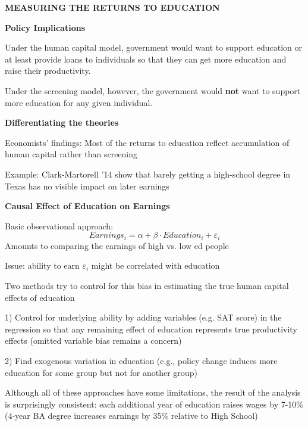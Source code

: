 \documentclass[landscape]{slides}
\begin{document}
\begin{slide}
\begin{center}
{\bf MEASURING THE RETURNS TO EDUCATION}
\end{center}

{\bf Policy Implications}

Under the human capital model, government would want to support education or at least provide loans to individuals so that they can get more education and raise their productivity.

Under the screening model, however, the government would \textbf{not} want to support more education for any given individual.

{\bf Differentiating the theories}

Economists' findings: Most of the returns to education reflect accumulation of human capital rather than screening

Example: Clark-Martorell '14 show that barely getting a high-school degree in Texas has no visible impact on later earnings 

\end{slide}

\begin{slide}

\end{slide}

\begin{slide}
\begin{center}
{\bf Causal Effect of Education on Earnings}
\end{center}

Basic observational approach:
\[ Earnings_i= \alpha + \beta \cdot Education_i + \varepsilon_i \]
Amounts to comparing the earnings of high vs. low ed people

Issue: ability to earn $\varepsilon_i$ might be correlated with education 

Two methods try to control for this bias in estimating the true human capital effects of education

\small
1)  Control for underlying ability by adding variables (e.g. SAT score) in the regression so that any remaining effect of education represents true productivity effects (omitted variable bias remains a concern)

2) Find exogenous variation in education (e.g., policy change induces more education for some group but not for another
group)

Although all of these approaches have some limitations, the result of the analysis is surprisingly consistent: each additional year of education raises wages by 7-10\% (4-year BA degree increases earnings by 35\% relative to High School)
\end{slide}
\end{document}
